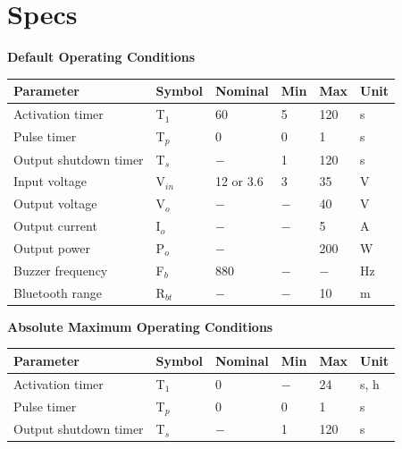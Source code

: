 \documentclass{article}
\begin{document}
\section{Specs}
\begin{center}
	\textbf{Default Operating Conditions}\\
	\begin{tabular}{ |p{5cm}||p{1.5cm}|p{1.5cm}|p{1cm}|p{1cm}|p{4cm}|}
		\hline
		\textbf{Parameter}&\textbf{Symbol}&\textbf{Nominal}&\textbf{Min}&\textbf{Max}&\textbf{Unit}\\
		\hline\hline
		Activation timer						&	T$_1$	&	60	&	5	&	120	&	s	\\
		Pulse timer\footnotemark[1]				&	T$_p$	&	0	&	0	&	1	&	s	\\
		Output shutdown timer\footnotemark[1]	&	T$_s$	&	$-$	&	1	&	120	&	s	\\
		\hline
		Input voltage		&	V$_{in}$&12 or 3.6&	3	&	35	&	V	\\
		Output voltage		& 	V$_o$	&	$-$	&	$-$	&	40	&	V	\\
		Output current		&	I$_o$	&	$-$	&	$-$	&	5	&	A	\\
		Output power		&	P$_o$	&	$-$	&		&	200	&	W	\\
		\hline
		Buzzer frequency	&	F$_b$	&	880	&	$-$	&	$-$	&	Hz	\\
		Bluetooth range 	&	R$_{bt}$&	$-$	&	$-$	&	10	&	m	\\

		\hline
	\end{tabular}
	\newline\newline\newline
	\textbf{Absolute Maximum Operating Conditions}\\
	\begin{tabular}{ |p{5cm}||p{1.5cm}|p{1.5cm}|p{1cm}|p{1cm}|p{4cm}|}
		\hline
		\textbf{Parameter}&\textbf{Symbol}&\textbf{Nominal}&\textbf{Min}&\textbf{Max}&\textbf{Unit}\\
		\hline\hline
		Activation timer\footnotemark[2]	&	T$_1$	&	0	&	$-$	&	24	&	s, h	\\
		Pulse timer\footnotemark[1]\footnotemark[2]				&	T$_p$	&	0	&	0	&	1	&	s	\\
		Output shutdown timer\footnotemark[1]\footnotemark[2]	&	T$_s$	&	$-$	&	1	&	120	&	s	\\

		\hline
	\end{tabular}
\end{center}
\end{document}
